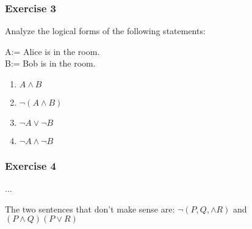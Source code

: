 \subsubsection{Exercise 3}

\question Analyze the logical forms of the following statements:

A:= Alice is in the room. \\
B:= Bob is in the room.

\begin{solution}
    \begin{enumerate}[label=(\alph*)]
        \item $A \wedge B$
        \item $\neg (A \wedge B)$
        \item $\neg A \vee \neg B$
        \item $\neg A \wedge \neg B$
    \end{enumerate}
\end{solution}


\subsubsection{Exercise 4}
\question ...

\begin{solution}
    The two sentences that don't make sense are:
    $\neg(P, Q, \wedge R)$ and \\
    $(P \wedge Q)(P\vee R)$
\end{solution}

